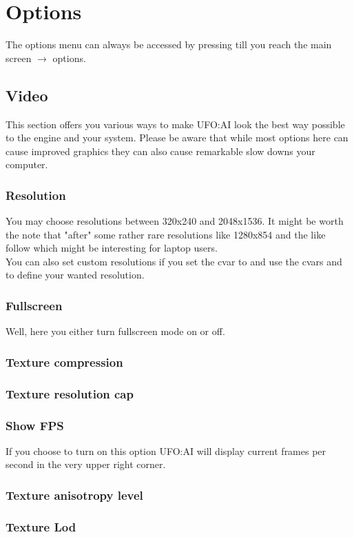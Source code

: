 \section{Options}
The options menu can always be accessed by pressing  till you reach the main screen $\rightarrow$ options.

\subsection{Video}
This section offers you various ways to make UFO:AI look the best way possible to the engine and your system. Please be aware that while most options here can cause improved graphics they can also cause remarkable slow downs your computer.
\subsubsection*{Resolution}
You may choose resolutions between 320x240 and 2048x1536. It might be worth the note that "after" some rather rare resolutions like 1280x854 and the like follow which might be interesting for laptop users.\\
You can also set custom resolutions if you set the cvar  to  and use the cvars  and  to define your wanted resolution.
\subsubsection*{Fullscreen}
Well, here you either turn fullscreen mode on or off.
\subsubsection*{Texture compression}
\subsubsection*{Texture resolution cap}
\subsubsection*{Show FPS}
If you choose to turn on this option UFO:AI will display current frames per second in the very upper right corner.
\subsubsection*{Texture anisotropy level}
\subsubsection*{Texture Lod}
